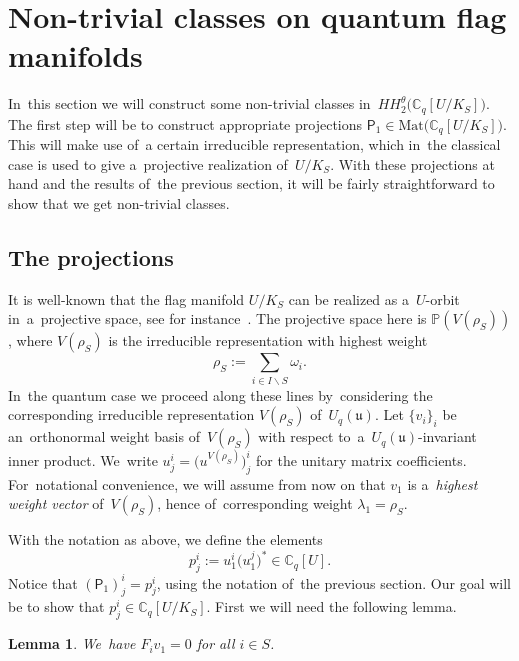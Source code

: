 \documentclass[10pt,a4paper]{amsart}
\numberwithin{equation}{section}
\newtheorem{Lemma}[Theorem]{Lemma}
\newcommand{\Uqu}{U_q(\mathfrak{u})}
\newcommand{\CqU}{\mathbb{C}_q[U]}
\newcommand{\Cqflag}{\mathbb{C}_q[U / K_S]}
\newcommand{\proj}{\mathsf{P}}
\begin{document}
\section{Non-trivial classes on quantum flag manifolds}\label{sec:quantum-classes}

In~this section we will construct some non-trivial classes in~$HH^\theta_2\big(\Cqflag\big)$.
The first step will be to construct appropriate projections $\proj_1 \in \mathrm{Mat}\big(\Cqflag\big)$.
This will make use of~a certain irreducible representation, which in~the classical case is used to give a~projective realization of~$U / K_S$. With these projections at hand and the results of~the previous section, it will be fairly straightforward to show that we get non-trivial classes.

\subsection{The projections}
\label{sec:proj-quantum}

It is well-known that the flag manifold $U / K_S$ can be realized as a~$U$-orbit in~a~projective space, see for instance~\cite[Section~3.2.8]{cap-book}.
The projective space here is $\mathbb{P}(V(\rho_S))$, where $V(\rho_S)$ is the irreducible representation with highest weight
\[
\rho_S := \sum_{i \in I \backslash S} \omega_i.
\]
In~the quantum case we proceed along these lines by~considering the corresponding irreducible representation $V(\rho_S)$ of~$\Uqu$.
Let $\{v_i\}_i$ be an~orthonormal weight basis of~$V(\rho_S)$ with respect to~a~$\Uqu$-invariant inner product.
We~write $u^i_j = \big(u^{V(\rho_S)}\big)^i_j$ for the unitary matrix coefficients.
For~notational convenience, we will assume from now on that $v_1$ is a~\emph{highest weight vector} of~$V(\rho_S)$, hence of~corresponding weight $\lambda_1 = \rho_S$.

With the notation as above, we define the elements
\begin{equation}
\label{eq:quantum-proj}
p^i_j := u^i_1 \big(u^j_1\big)^* \in \CqU.
\end{equation}
Notice that $(\proj_1)^i_j = p^i_j$, using the notation of~the previous section.
Our goal will be to show that $p^i_j \in \Cqflag$.
First we will need the following lemma.

\begin{Lemma}
\label{lem:action-Fi}
We~have $F_i v_1 = 0$ for all $i \in S$.
\end{Lemma}
\end{document}
